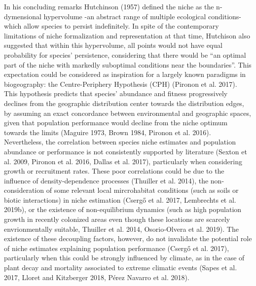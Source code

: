\documentclass[11pt,twoside]{reedthesis}
\begin{document}
In his concluding remarks Hutchinson (1957) defined the niche as the
n-dymensional hypervolume -an abstract range of multiple ecological
conditions- which allow species to persist indefinitely. In spite of the
contemporary limitations of niche formalization and representation at
that time, Hutchison also suggested that within this hypervolume, all
points would not have equal probability for species' persistence,
considering that there would be ``an optimal part of the niche with
markedly suboptimal conditions near the boundaries''. This expectation
could be considered as inspiration for a largely known paradigms in
biogeography: the Centre-Periphery Hypothesis (CPH) (Pironon et al.
2017). This hypothesis predicts that species' abundance and fitness
progressively declines from the geographic distribution center towards
the distribution edges, by assuming an exact concordance between
environmental and geographic spaces, given that population performance
would decline from the niche optimum towards the limits (Maguire 1973,
Brown 1984, Pironon et al. 2016). Nevertheless, the correlation between
species niche estimates and population abundance or performance is not
consistently supported by literature (Sexton et al. 2009, Pironon et al.
2016, Dallas et al. 2017), particularly when considering growth or
recruitment rates. These poor correlations could be due to the influence
of density-dependence processes (Thuiller et al. 2014), the
non-consideration of some relevant local mircrohabitat conditions (such
as soils or biotic interactions) in niche estimation (Csergő et al.
2017, Lembrechts et al. 2019b), or the existence of non-equilibrium
dynamics (such as high population growth in recently colonized areas
even though these locations are scarcely envrionmentally suitable,
Thuiller et al. 2014, Osorio‐Olvera et al. 2019). The existence of these
decoupling factors, however, do not invalidate the potential role of
niche estimates explaining population performance (Csergő et al. 2017),
particularly when this could be strongly influenced by climate, as in
the case of plant decay and mortality associated to extreme climatic
events (Sapes et al. 2017, Lloret and Kitzberger 2018, Pérez Navarro et
al. 2018).\par
\end{document}
